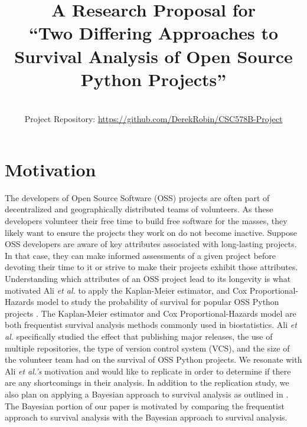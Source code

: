\documentclass[conference]{IEEEtran}
\begin{document}


\title{A Research Proposal for \\``Two Differing Approaches to Survival Analysis of Open Source Python Projects''}

\author{
 \\
Project Repository: \url{https://github.com/DerekRobin/CSC578B-Project}
}

\maketitle

\section{Motivation}

The developers of Open Source Software (OSS) projects are often part of decentralized and geographically distributed teams of volunteers. As these developers volunteer their free time to build free software for the masses, they likely want to ensure the projects they work on do not become inactive. Suppose OSS developers are aware of key attributes associated with long-lasting projects. In that case, they can make informed assessments of a given project before devoting their time to it or strive to make their projects exhibit those attributes. Understanding which attributes of an OSS project lead to its longevity is what motivated Ali \emph{et al.} to apply the Kaplan-Meier estimator, and Cox Proportional-Hazards model to study the probability of survival for popular OSS Python projects \cite{ali2020cheating}. The Kaplan-Meier estimator and Cox Proportional-Hazards model are both frequentist survival analysis methods commonly used in biostatistics.  Ali \emph{et al.} specifically studied the effect that publishing major releases, the use of multiple repositories, the type of version control system (VCS), and the size of the volunteer team had on the survival of OSS Python projects. We resonate with Ali \emph{et al.'s} motivation and would like to replicate \cite{ali2020cheating} in order to determine if there are any shortcomings in their analysis. In addition to the replication study, we also plan on applying a Bayesian approach to survival analysis as outlined in \cite{kelter2020bayesian}. The Bayesian portion of our paper is motivated by comparing the frequentist approach to survival analysis with the Bayesian approach to survival analysis.
\end{document}
